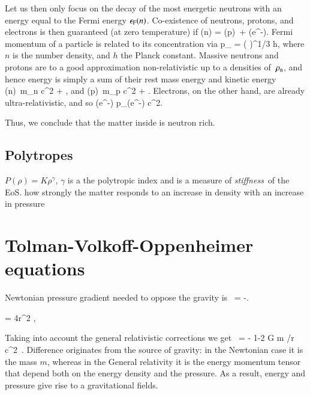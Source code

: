 Let us then only focus on the decay of the most energetic neutrons with an energy equal to the Fermi energy $\epsilon_{\mathrm{F}} (n)$.
Co-existence of neutrons, protons, and electrons is then guaranteed (at zero temperature) if 
\be
\ef(n) = \ef(p) + \ef(e^{-}).
\ee
Fermi momentum of a particle is related to its concentration via
\be
p_{} = \left(  \right)^{1/3} h,
\ee
where $n$ is the number density, and $h$ the Planck constant.
Massive neutrons and protons are to a good approximation non-relativistic up to a densities of $\, \rho_{\mathrm{n}} $, and hence energy is simply a sum of their rest mass energy and kinetic energy
\be
\ef(n) \approx m_n c^2 + ,
\ee
and
\be
\ef(p) \approx m_p c^2 + .
\ee
Electrons, on the other hand, are already ultra-relativistic, and so
\be
\ef(e^{-}) \approx p_{}(e^{-}) c^2.
\ee

Thus, we conclude that the matter inside is neutron rich.


\subsection{Polytropes}

$P(\rho) = K \rho^{\gamma}$, $\gamma$ is a the polytropic index and is a measure of \emph{stiffness} of the EoS.
how strongly the matter responds to an increase in density with an increase in pressure





\section{Tolman-Volkoff-Oppenheimer equations}
Newtonian pressure gradient needed to oppose the gravity is
\be
{} = -.
\ee

\be
{} = 4\pi r^2 \rho,
\ee

Taking into account the general relativistic corrections we get
\be
{} = 
    - \times 
    {1-2 G m /r c^2 }.
\ee
Difference originates from the source of gravity:
in the Newtonian case it is the mass $m$, whereas in the General relativity it is the energy momentum tensor that depend both on the energy density and the pressure.
As a result, energy and pressure give rise to a gravitational fields.

